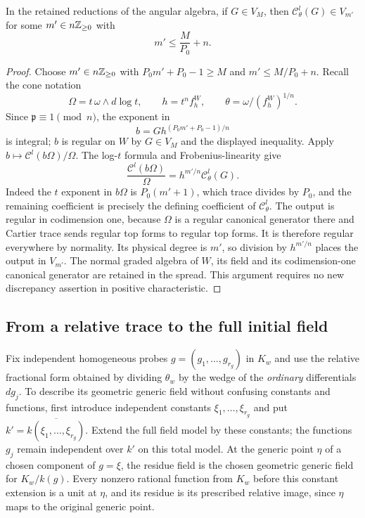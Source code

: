 \begin{lemma}\label{c:trace-degree}
In the retained reductions of the angular algebra, if $G\in V_M$, then
$\mathcal C^l_\theta(G)\in V_{m'}$ for some $m'\in n\mathbb Z_{\ge0}$ with
\[
 m'\le\frac{M}{P_0}+n.
\]
\end{lemma}

\begin{proof}
Choose $m'\in n\mathbb Z_{\ge0}$ with
$P_0m'+P_0-1\ge M$ and $m'\le M/P_0+n$.  Recall the cone notation
\[
 \Omega=t\,\omega\wedge d\log t,\qquad
 h=t^nf_h^W,\qquad \theta=\omega/(f_h^W)^{1/n}.
\]
Since $\mathfrak p\equiv1\pmod n$, the exponent in
\[
 b=G h^{(P_0m'+P_0-1)/n}
\]
is integral; $b$ is regular on $W$ by $G\in V_M$ and the displayed
inequality.  Apply $b\mapsto\mathcal C^l(b\Omega)/\Omega$.
The log-$t$ formula and Frobenius-linearity give
\[
 \frac{\mathcal C^l(b\Omega)}{\Omega}
       =h^{m'/n}\mathcal C^l_\theta(G).
\]
Indeed the $t$ exponent in $b\Omega$ is $P_0(m'+1)$, which trace divides
by $P_0$, and the remaining coefficient is precisely the defining
coefficient of $\mathcal C^l_\theta$.
The output is regular in codimension one, because $\Omega$ is a regular
canonical generator there and Cartier trace sends regular top forms to
regular top forms.  It is therefore regular everywhere by normality.
Its physical degree is $m'$, so division by $h^{m'/n}$ places the output
in $V_{m'}$.  The normal graded algebra of $W$, its field and its
codimension-one canonical generator are retained in the spread.  This
argument requires no new discrepancy assertion in positive characteristic.
\end{proof}

\subsection{From a relative trace to the full initial field}

Fix independent homogeneous probes $g=(g_1,\ldots,g_{r_g})$ in $K_w$ and
use the relative fractional form obtained by dividing $\theta_w$ by the
wedge of the \emph{ordinary} differentials $dg_j$.  To describe its
geometric generic field without confusing constants and functions, first
introduce independent constants $\xi_1,\ldots,\xi_{r_g}$ and put
$k'=\overline{k(\xi_1,\ldots,\xi_{r_g})}$.  Extend the full field model by
these constants; the functions $g_j$ remain independent over $k'$ on this
total model.  At the generic point $\eta$ of a chosen component of
$g=\xi$, the residue field is the chosen geometric generic field for
$K_w/k(g)$.  Every nonzero rational function from $K_w$ before this
constant extension is a unit at $\eta$, and its residue is its prescribed
relative image, since $\eta$ maps to the original generic point.

